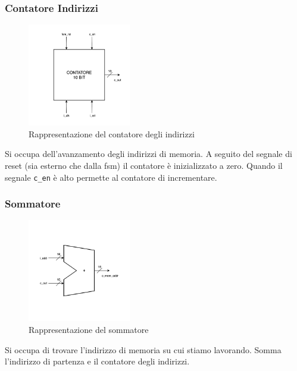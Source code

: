 \subsubsection{Contatore Indirizzi}
\begin{figure}[H]
    \centering
    \includegraphics[width=0.4\textwidth]{figures/counter_10.png}
    \caption{Rappresentazione del contatore degli indirizzi}
    \label{fig:counter_10}
\end{figure}

Si occupa dell'avanzamento degli indirizzi di memoria. A seguito del segnale di reset (sia esterno che dalla fsm) il contatore è inizializzato a zero. Quando il segnale \lstinline[columns=fixed]{c_en} è alto permette al contatore di incrementare.

\subsubsection{Sommatore}
\begin{figure}[H]
    \centering
    \includegraphics[width=0.4\textwidth]{figures/adder.png}
    \caption{Rappresentazione del sommatore}
    \label{fig:adder}
\end{figure}

Si occupa di trovare l'indirizzo di memoria su cui stiamo lavorando. Somma l'indirizzo di partenza e il contatore degli indirizzi.

